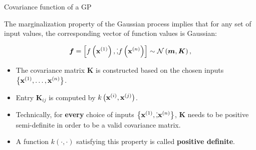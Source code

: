 \begin{frame}[c,allowframebreaks]{Covariance function of a GP}

The marginalization property of the Gaussian process implies that for any set of input values, the corresponding vector of function values is Gaussian:

  $$
    \bm{f} = \left[f\left(\mathbf{x}^{(1)}\right),\dot, f\left(\mathbf{x}^{(n)}\right)\right] \sim \mathcal{N}\left(\bm{m}, \bm{K}\right),
  $$ 


\begin{itemize}

  \item The covariance matrix $\bm{K}$ is constructed based on the chosen inputs $\left\{\mathbf{x}^{(1)},\dots,\mathbf{x}^{(n)}\right\}$.
  \item Entry $\bm{K}_{ij}$ is computed by $k\left(\mathbf{x}^{(i)}, \mathbf{x}^{(j)}\right)$.
  \item Technically, for \textbf{every} choice of inputs $\left\{\mathbf{x}^{(1)},\dot,\mathbf{x}^{(n)}\right\}$, $\bm{K}$ needs to be positive semi-definite in order to be a valid covariance matrix.
  \item A function $k(\cdot,\cdot)$ satisfying this property is called \textbf{positive definite}.
  
\end{itemize}
\framebreak






\framebreak






\framebreak






\framebreak






\framebreak






\framebreak







\end{frame}
